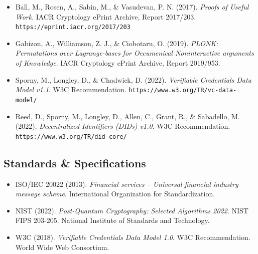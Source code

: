 \documentclass[11pt]{article}
\begin{document}
\begin{itemize}[leftmargin=*, label={}]
  \item Ball, M., Rosen, A., Sabin, M., \& Vasudevan, P. N. (2017). \textit{Proofs of Useful Work}. IACR Cryptology ePrint Archive, Report 2017/203. \texttt{https://eprint.iacr.org/2017/203}

  \item Gabizon, A., Williamson, Z. J., \& Ciobotaru, O. (2019). \textit{PLONK: Permutations over Lagrange-bases for Oecumenical Noninteractive arguments of Knowledge}. IACR Cryptology ePrint Archive, Report 2019/953.

  \item Sporny, M., Longley, D., \& Chadwick, D. (2022). \textit{Verifiable Credentials Data Model v1.1}. W3C Recommendation. \texttt{https://www.w3.org/TR/vc-data-model/}

  \item Reed, D., Sporny, M., Longley, D., Allen, C., Grant, R., \& Sabadello, M. (2022). \textit{Decentralized Identifiers (DIDs) v1.0}. W3C Recommendation. \texttt{https://www.w3.org/TR/did-core/}
\end{itemize}

\subsection*{Standards \& Specifications}

\begin{itemize}[leftmargin=*, label={}]
  \item ISO/IEC 20022 (2013). \textit{Financial services -- Universal financial industry message scheme}. International Organization for Standardization.

  \item NIST (2022). \textit{Post-Quantum Cryptography: Selected Algorithms 2022}. NIST FIPS 203-205. National Institute of Standards and Technology.

  \item W3C (2018). \textit{Verifiable Credentials Data Model 1.0}. W3C Recommendation. World Wide Web Consortium.
\end{itemize}
\end{document}
